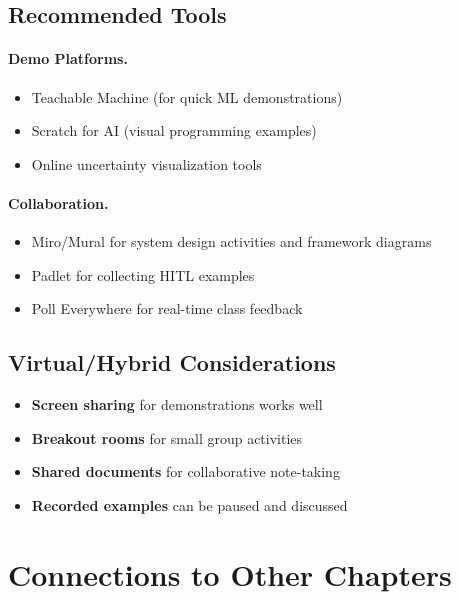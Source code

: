 \subsection{Recommended Tools}

\paragraph{Demo Platforms.}
\begin{itemize}
    \item Teachable Machine (for quick ML demonstrations)
    \item Scratch for AI (visual programming examples)
    \item Online uncertainty visualization tools
\end{itemize}

\paragraph{Collaboration.}
\begin{itemize}
    \item Miro/Mural for system design activities and framework diagrams
    \item Padlet for collecting HITL examples
    \item Poll Everywhere for real-time class feedback
\end{itemize}

\subsection{Virtual/Hybrid Considerations}
\begin{itemize}
    \item \textbf{Screen sharing} for demonstrations works well
    \item \textbf{Breakout rooms} for small group activities
    \item \textbf{Shared documents} for collaborative note-taking
    \item \textbf{Recorded examples} can be paused and discussed
\end{itemize}

\section{Connections to Other Chapters}

